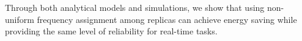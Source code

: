 Through both analytical models and simulations, we show that using non-uniform frequency assignment among replicas can achieve energy saving while providing the same level of reliability for real-time tasks.
